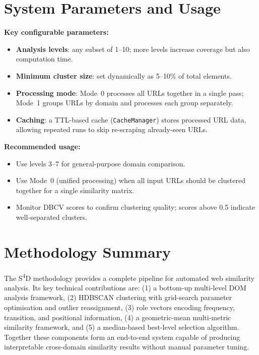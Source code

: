 \section{System Parameters and Usage}
\label{sec:usage-parameters}

\textbf{Key configurable parameters:}
\begin{itemize}
    \item \textbf{Analysis levels}: any subset of 1--10; more levels increase coverage but also computation time.
    \item \textbf{Minimum cluster size}: set dynamically as 5--10\% of total elements.
    \item \textbf{Processing mode}: Mode~0 processes all URLs together in a single pass; Mode~1 groups URLs by domain and processes each group separately.
    \item \textbf{Caching}: a TTL-based cache (\texttt{CacheManager}) stores processed URL data, allowing repeated runs to skip re-scraping already-seen URLs.
\end{itemize}

\textbf{Recommended usage:}
\begin{itemize}
    \item Use levels 3--7 for general-purpose domain comparison.
    \item Use Mode~0 (unified processing) when all input URLs should be clustered together for a single similarity matrix.
    \item Monitor DBCV scores to confirm clustering quality; scores above 0.5 indicate well-separated clusters.
\end{itemize}

\section{Methodology Summary}
\label{sec:methodology-summary}

The S\textsuperscript{4}D methodology provides a complete pipeline for automated web similarity analysis. Its key technical contributions are: (1) a bottom-up multi-level DOM analysis framework, (2) HDBSCAN clustering with grid-search parameter optimisation and outlier reassignment, (3) role vectors encoding frequency, transition, and positional information, (4) a geometric-mean multi-metric similarity framework, and (5) a median-based best-level selection algorithm. Together these components form an end-to-end system capable of producing interpretable cross-domain similarity results without manual parameter tuning.
